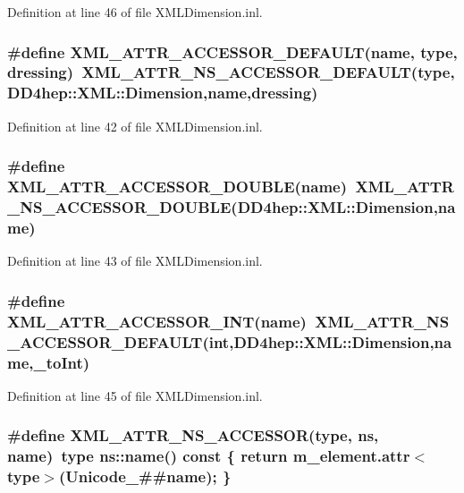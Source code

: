 Definition at line 46 of file XMLDimension.inl.\hypertarget{_x_m_l_dimension_8inl_a5329c32158716b05939bad5ab5e572df}{
\subsubsection[{XML\_\-ATTR\_\-ACCESSOR\_\-DEFAULT}]{\setlength{\rightskip}{0pt plus 5cm}\#define XML\_\-ATTR\_\-ACCESSOR\_\-DEFAULT(name, \/  type, \/  dressing)~XML\_\-ATTR\_\-NS\_\-ACCESSOR\_\-DEFAULT(type,{\bf DD4hep::XML::Dimension},name,dressing)}}
\label{_x_m_l_dimension_8inl_a5329c32158716b05939bad5ab5e572df}


Definition at line 42 of file XMLDimension.inl.\hypertarget{_x_m_l_dimension_8inl_a3b2602f2e6cdf903b4d9acd047d61b12}{
\subsubsection[{XML\_\-ATTR\_\-ACCESSOR\_\-DOUBLE}]{\setlength{\rightskip}{0pt plus 5cm}\#define XML\_\-ATTR\_\-ACCESSOR\_\-DOUBLE(name)~XML\_\-ATTR\_\-NS\_\-ACCESSOR\_\-DOUBLE({\bf DD4hep::XML::Dimension},name)}}
\label{_x_m_l_dimension_8inl_a3b2602f2e6cdf903b4d9acd047d61b12}


Definition at line 43 of file XMLDimension.inl.\hypertarget{_x_m_l_dimension_8inl_aa9f53a44681848d2aeda1c5cdac2efb8}{
\subsubsection[{XML\_\-ATTR\_\-ACCESSOR\_\-INT}]{\setlength{\rightskip}{0pt plus 5cm}\#define XML\_\-ATTR\_\-ACCESSOR\_\-INT(name)~XML\_\-ATTR\_\-NS\_\-ACCESSOR\_\-DEFAULT(int,{\bf DD4hep::XML::Dimension},name,\_\-toInt)}}
\label{_x_m_l_dimension_8inl_aa9f53a44681848d2aeda1c5cdac2efb8}


Definition at line 45 of file XMLDimension.inl.\hypertarget{_x_m_l_dimension_8inl_a712f343791889ac7912b917b64ccb32a}{
\subsubsection[{XML\_\-ATTR\_\-NS\_\-ACCESSOR}]{\setlength{\rightskip}{0pt plus 5cm}\#define XML\_\-ATTR\_\-NS\_\-ACCESSOR(type, \/  ns, \/  name)~type ns::name() const \{ return m\_\-element.attr$<$type$>$(Unicode\_\-\#\#name); \}}}
\label{_x_m_l_dimension_8inl_a712f343791889ac7912b917b64ccb32a}


